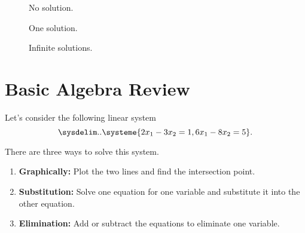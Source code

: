 \begin{multicols}{3}\noindent
  \begin{figure}[H]
    \centering


    \caption{No solution.}
    \label{fig:no_solution}
  \end{figure}
  \columnbreak
  \begin{figure}[H]
    \centering


    \caption{One solution.}
    \label{fig:on_solution}
  \end{figure}
  \columnbreak
  \begin{figure}[H]
    \centering


    \caption{Infinite solutions.}
    \label{fig:infinite_solutions}
  \end{figure}
\end{multicols}



\section{Basic Algebra Review}
\label{sec:basic_algebra_review}

Let's consider the following linear system
\[%
  \sysdelim..\systeme{
    2x_1 - 3x_2 = 1,
    6x_1 - 8x_2 = 5
  }
.\]%

There are three ways to solve this system.
\begin{enumerate}
  \label{enum:three_ways_to_solve_a_linear_system}

  \item \textbf{Graphically:} Plot the two lines and find the intersection
    point.

  \item \textbf{Substitution:} Solve one equation for one variable and
    substitute it into the other equation.

  \item \textbf{Elimination:} Add or subtract the equations to eliminate one
    variable.
\end{enumerate}

